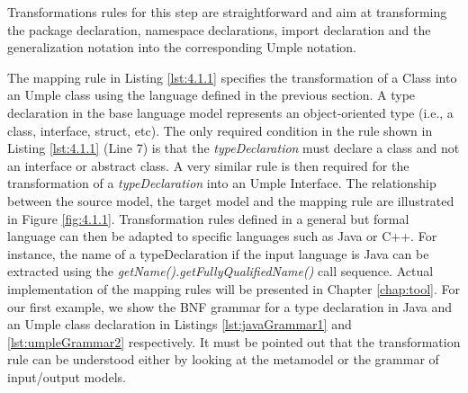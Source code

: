 Transformations rules for this step are straightforward and aim at transforming the package declaration, namespace declarations, import declaration and the generalization notation into the corresponding Umple notation. 

The mapping rule in Listing \ref{lst:4.1.1} specifies the transformation of a Class into an Umple class using the language defined in the previous section. A type declaration in the base language model represents an object-oriented type (i.e., a class, interface, struct, etc). The only required condition in the rule shown in Listing \ref{lst:4.1.1} (Line 7) is that the \textit{typeDeclaration} must declare a class and not an interface or abstract class. A very similar rule is then required for the transformation of a \textit{typeDeclaration} into an Umple Interface. The relationship between the source model, the target model and the mapping rule are illustrated in Figure \ref{fig:4.1.1}. Transformation rules defined in a general but formal language can then be adapted to specific languages such as Java or C++. For instance, the name of a typeDeclaration if the input language is Java can be extracted using the \textit{getName().getFullyQualifiedName()} call sequence. Actual implementation of the mapping rules will be presented in Chapter \ref{chap:tool}. For our first example, we show the BNF grammar for a type declaration in Java and an Umple class declaration in Listings \ref{lst:javaGrammar1} and \ref{lst:umpleGrammar2} respectively. It must be pointed out that the transformation rule can be understood either by looking at the metamodel or the grammar of input/output models. 




